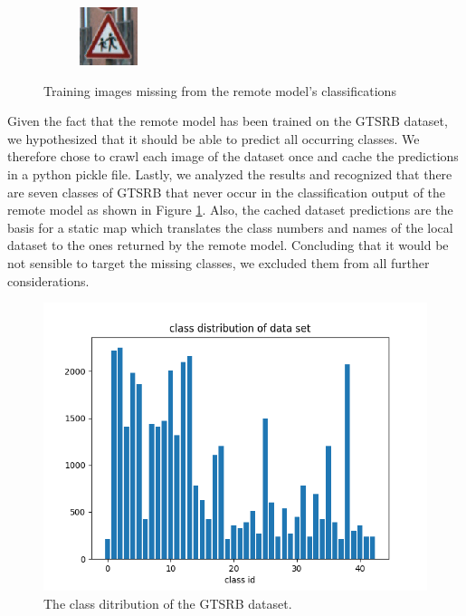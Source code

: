 \begin{figure}
\begin{subfigure}{.19\linewidth}
\end{subfigure}
\begin{subfigure}{.19\linewidth}
\includegraphics[width=0.7\linewidth]{imgs/missing/00014_00027}
\end{subfigure}
\caption{Training images missing from the remote model's classifications}
\label{fig:missing}
\end{figure}

Given the fact that the remote model has been trained on the GTSRB dataset, we hypothesized that it should be able to predict all occurring classes.
We therefore chose to crawl each image of the dataset once and cache the predictions in a python pickle file.
Lastly, we analyzed the results and recognized that there are seven classes of GTSRB that never occur in the classification output of the remote model as shown in Figure \ref{fig:missing}.
Also, the cached dataset predictions are the basis for a static map which translates the class numbers and names of the local dataset to the ones returned by the remote model.
Concluding that it would be not sensible to target the missing classes, we excluded them from all further considerations.


\begin{figure}
	\includegraphics[width=1.1\linewidth]{figs/class_distr}
	\caption{The class ditribution of the GTSRB dataset.}
	\label{fig:class_distr}
\end{figure}

